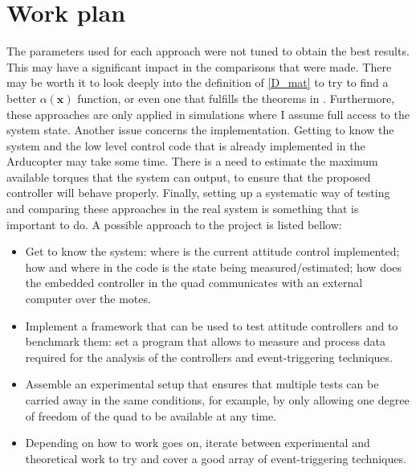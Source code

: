 \documentclass{article}
\begin{document}
	\section{Work plan}
		The parameters used for each approach were not tuned to obtain the best results. This may have a significant impact in the comparisons that were made. There may be worth it to look deeply into the definition of \eqref{D_mat} to try to find a better $\alpha(\mathbf{x})$ function, or even one that fulfills the theorems in \cite{tabuada_event_control}. Furthermore, these approaches are only applied in simulations where I assume full access to the system state. Another issue concerns the implementation. Getting to know the system and the low level control code that is already implemented in the Arducopter may take some time. There is a need to estimate the maximum available torques that the system can output, to ensure that the proposed controller will behave properly. Finally, setting up a systematic way of testing and comparing these approaches in the real system is something that is important to do. A possible approach to the project is listed bellow:
		\begin{itemize}
			\item Get to know the system: where is the current attitude control implemented; how and where in the code is the state being measured/estimated; how does the embedded controller in the quad communicates with an external computer over the motes.
			\item Implement a framework that can be used to test attitude controllers and to benchmark them: set a program that allows to measure and process data required for the analysis of the controllers and event-triggering techniques.
			\item Assemble an experimental setup that ensures that multiple tests can be carried away in the same conditions, for example, by only allowing one degree of freedom of the quad to be available at any time.
			\item Depending on how to work goes on, iterate between experimental and theoretical work to try and cover a good array of event-triggering techniques.
		\end{itemize}
	
	
	
\end{document}
